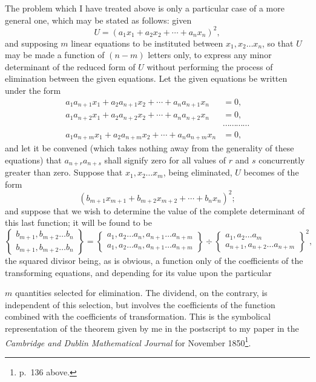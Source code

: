 \documentclass[11pt]{article}
\newcommand{\sourcepage}[1]{\marginpar{\scriptsize p.~#1}}
\newcommand{\bd}[2]{\left\{\begin{matrix}#1\\#2\end{matrix}\right\}}
\begin{document}
{{The problem which I have treated above is only a particular case of a more general one, which may be stated as follows: given
\[
U=(a_1x_1+a_2x_2+\cdots+a_nx_n)^2,
\]
and supposing $m$ linear equations to be instituted between $x_1,x_2\ldots x_n$, so that $U$ may be made a function of $(n-m)$ letters only, to express any minor determinant of the reduced form of $U$ without performing the process of elimination between the given equations. Let the given equations be written under the form
\[
\begin{aligned}
a_1a_{n+1}x_1+a_2a_{n+1}x_2+\cdots+a_na_{n+1}x_n&=0,\\
a_1a_{n+2}x_1+a_2a_{n+2}x_2+\cdots+a_na_{n+2}x_n&=0,\\
&\cdots\cdots\cdots\cdots\\
a_1a_{n+m}x_1+a_2a_{n+m}x_2+\cdots+a_na_{n+m}x_n&=0,
\end{aligned}
\]
and let it be convened (which takes nothing away from the generality of these equations) that $a_{n+r}a_{n+s}$ shall signify zero for all values of $r$ and $s$ concurrently greater than zero. Suppose that $x_1,x_2\ldots x_m$, being eliminated, $U$ becomes of the form
\[
(b_{m+1}x_{m+1}+b_{m+2}x_{m+2}+\cdots+b_nx_n)^2;
\]
and suppose that we wish to determine the value of the complete determinant of this last function; it will be found to be
\[
\bd{b_{m+1},b_{m+2}\ldots b_n}{b_{m+1},b_{m+2}\ldots b_n}
=
\bd{a_1,a_2\ldots a_n,a_{n+1}\ldots a_{n+m}}{a_1,a_2\ldots a_n,a_{n+1}\ldots a_{n+m}}
\div
\bd{a_1,a_2\ldots a_m}{a_{n+1},a_{n+2}\ldots a_{n+m}}^2,
\]
the squared divisor being, as is obvious, a function only of the coefficients of the transforming equations, and depending for its value upon the particular

\sourcepage{246}
$m$ quantities selected for elimination. The dividend, on the contrary, is independent of this selection, but involves the coefficients of the function combined with the coefficients of transformation. This is the symbolical representation of the theorem given by me in the postscript to my paper in the \emph{Cambridge and Dublin Mathematical Journal} for November 1850\footnote{p.~136 above.}.

}}
\end{document}
